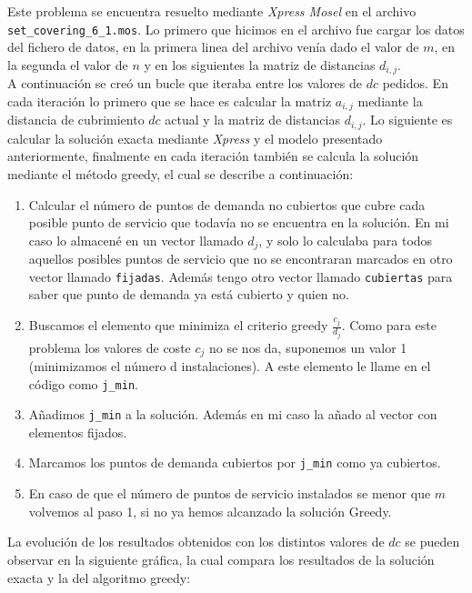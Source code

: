 \documentclass[a4paper,11pt]{article}
\begin{document}
Este problema se encuentra resuelto mediante \textit{Xpress Mosel} en el archivo \texttt{set\_covering\_6\_1.mos}. Lo primero que hicimos en el archivo fue cargar los datos del fichero de datos, en la primera linea del archivo venía dado el valor de ${m}$, en la segunda el valor de ${n}$ y en los siguientes la matriz de distancias ${d_{i,j}}$.\\

A continuación se creó un bucle que iteraba entre los valores de ${dc}$ pedidos. En cada iteración lo primero que se hace es calcular la matriz ${a_{i,j}}$ mediante la distancia de cubrimiento ${dc}$ actual y la matriz de distancias ${d_{i,j}}$. Lo siguiente es calcular la solución exacta mediante \textit{Xpress} y el modelo presentado anteriormente, finalmente en cada iteración también se calcula la solución mediante el método greedy, el cual se describe a continuación:

\begin{enumerate}
\item Calcular el número de puntos de demanda no cubiertos que cubre cada posible punto de servicio que todavía no se encuentra en la solución. En mi caso lo almacené en un vector llamado ${d_{j}}$, y solo lo calculaba para todos aquellos posibles puntos de servicio que no se encontraran marcados en otro vector llamado \texttt{fijadas}. Además tengo otro vector llamado \texttt{cubiertas} para saber que punto de demanda ya está cubierto y quien no.
\item Buscamos el elemento que minimiza el criterio greedy ${\frac{c_{j}}{d_{j}}}$. Como para este problema los valores de coste ${c_{j}}$ no se nos da, suponemos un valor 1 (minimizamos el número d instalaciones). A este elemento le llame en el código como \texttt{j\_min}.
\item Añadimos \texttt{j\_min} a la solución. Además en mi caso la añado al vector con elementos fijados.
\item Marcamos los puntos de demanda cubiertos por \texttt{j\_min} como ya cubiertos.
\item En caso de que el número de puntos de servicio instalados se menor que ${m}$ volvemos al paso 1, si no ya hemos alcanzado la solución Greedy.
\end{enumerate}

La evolución de los resultados obtenidos con los distintos valores de ${dc}$ se pueden observar en la siguiente gráfica, la cual compara los resultados de la solución exacta y la del algoritmo greedy:
\end{document}
